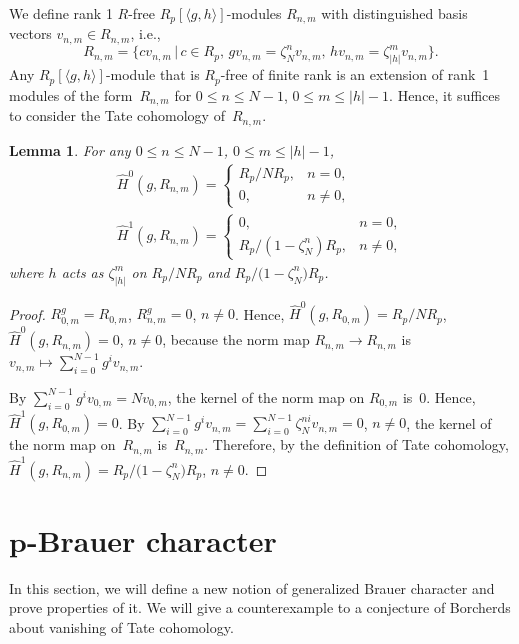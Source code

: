 \documentclass[11pt]{article}
\numberwithin{equation}{section}
\numberwithin{equation}{section}
\newtheorem{Lemma}[Theorem]{Lemma}
\begin{document}
We define rank 1 $R$-free $R_p[\langle g,h \rangle]$-modules $R_{n,m}$ with distinguished basis vectors $v_{n,m}\in R_{n,m}$, i.e.,
\[
R_{n,m}=\big\{cv_{n,m}\,|\,c\in R_p,\, gv_{n,m}=\zeta_N^nv_{n,m},\, hv_{n,m}=\zeta_{|h|}^mv_{n,m}\big\}.
\]
 Any $R_p[\langle g,h \rangle]$-module that is $R_p$-free of finite rank is an extension of rank~1 modules of the form~$R_{n,m}$ for $0\leq n\leq N-1$, $0\leq m\leq |h|-1$.
Hence, it suffices to consider the Tate cohomology of~$R_{n,m}$.

\begin{Lemma}\label{Tcoho}
For any $0\leq n \leq N-1$, $0\leq m \leq |h|-1$,
\begin{gather*}
\hat{H}^0(g,R_{n,m})= \begin{cases}
R_p/NR_p, & n=0, \\
0, & n\neq 0,
\end{cases}\\
\hat{H}^1(g,R_{n,m})= \begin{cases}
0, & n=0, \\
R_p/(1-\zeta_N^n)R_p, & n\neq 0,
\end{cases}
\end{gather*}
where $h$ acts as $\zeta_{|h|}^m$ on $R_p/NR_p$ and $R_p/\big(1-\zeta_N^n\big)R_p$.
\end{Lemma}

\begin{proof}
$R_{0,m}^g=R_{0,m}$, $R_{n,m}^g=0$, $n\neq 0$. Hence, $\hat{H}^0(g,R_{0,m})=R_p/NR_p$,
 $\hat{H}^0(g,R_{n,m})=0$, $n\neq 0$, because the norm map $R_{n,m} \rightarrow R_{n,m}$ is $v_{n,m} \mapsto \sum_{i=0}^{N-1}g^iv_{n,m}$.

By $\sum_{i=0}^{N-1}g^iv_{0,m}=Nv_{0,m}$, the kernel of the norm map on $R_{0,m}$ is~0. Hence, $\hat{H}^1(g,R_{0,m})=0$. By $\sum_{i=0}^{N-1}g^iv_{n,m}=\sum_{i=0}^{N-1}\zeta_N^{ni}v_{n,m}=0$, $n \neq 0$, the kernel of the norm map on~$R_{n,m}$ is~$R_{n,m}$. Therefore, by the definition of Tate cohomology, $\hat{H}^1(g,R_{n,m})=R_p/\big(1-\zeta_N^n\big)R_p$, $n\neq 0$.
\end{proof}


\section[p-Brauer character]{$\boldsymbol{p}$-Brauer character}\label{section5}

In this section, we will define a new notion of generalized Brauer character and prove properties of it. We will give a counterexample to a conjecture of Borcherds about vanishing of Tate cohomology.
\end{document}
